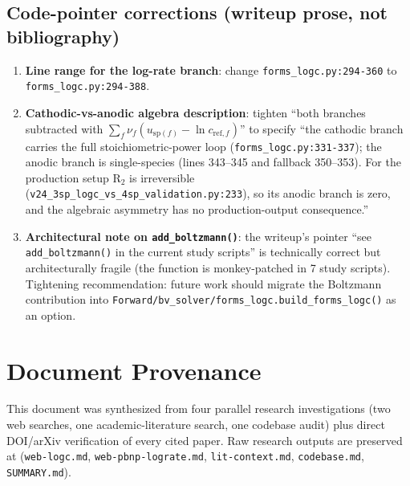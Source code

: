 \documentclass[11pt]{article}
\begin{document}
\subsection{Code-pointer corrections (writeup prose, not bibliography)}

\begin{enumerate}
\item \textbf{Line range for the log-rate branch}: change
      \texttt{forms\_logc.py:294-360} to \texttt{forms\_logc.py:294-388}.
\item \textbf{Cathodic-vs-anodic algebra description}: tighten ``both branches
      subtracted with $\sum_f\nu_f(u_{\mathrm{sp}(f)}-\ln c_{\mathrm{ref},f})$''
      to specify ``the cathodic branch carries the full stoichiometric-power
      loop (\texttt{forms\_logc.py:331-337}); the anodic branch is
      single-species (lines 343--345 and fallback 350--353). For the
      production setup $\mathrm{R}_2$ is irreversible
      (\texttt{v24\_3sp\_logc\_vs\_4sp\_validation.py:233}), so its anodic
      branch is zero, and the algebraic asymmetry has no production-output
      consequence.''
\item \textbf{Architectural note on \texttt{add\_boltzmann()}}: the writeup's
      pointer ``see \texttt{add\_boltzmann()} in the current study scripts''
      is technically correct but architecturally fragile (the function is
      monkey-patched in 7 study scripts). Tightening recommendation: future
      work should migrate the Boltzmann contribution into
      \texttt{Forward/bv\_solver/forms\_logc.build\_forms\_logc()} as an
      option.
\end{enumerate}

\section*{Document Provenance}
This document was synthesized from four parallel research investigations
(two web searches, one academic-literature search, one codebase audit) plus
direct DOI/arXiv verification of every cited paper. Raw research outputs are
preserved at 
(\texttt{web-logc.md}, \texttt{web-pbnp-lograte.md}, \texttt{lit-context.md},
\texttt{codebase.md}, \texttt{SUMMARY.md}).
\end{document}

